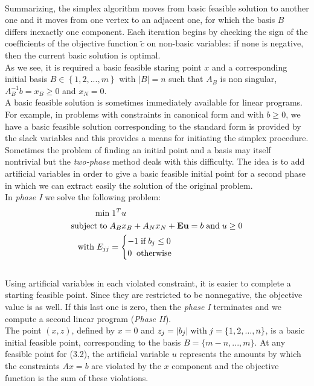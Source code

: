 \documentclass[a4paper,10 pt,titlepage,twoside]{book}
\theoremstyle{plain}
\theoremstyle{definition}
\theoremstyle{remark}
\begin{document}
\\
Summarizing, the simplex algorithm moves from basic feasible solution to another one and it moves from one vertex to an adjacent one, for which the basis $B$ differs inexactly one component. Each iteration begins by checking the sign of the coefficients of the objective function $\widetilde{c}$ on non-basic variables: if none is negative, then the current basic solution is optimal. \\
As we see, it is required a basic feasible staring point $x$ and a corresponding initial basis $B \in \left\{ 1,2,..., m \right\}$ with $|B|=n$ such that $A_{B}$ is non singular, $A_{B}^{-1}b=x_{B} \geq 0$ and $x_{N}=0$.\\
A basic feasible solution is sometimes immediately available for linear programs. For example, in problems with constraints in canonical form and with $b \geq 0$, we have a basic feasible solution corresponding to the standard form is provided by the slack variables and this provides a means for initiating the
simplex procedure.\\Sometimes the problem of finding an initial point and a basis may itself nontrivial but the \textit{two-phase} method deals with this difficulty. The idea is to add artificial variables in order to give a basic feasible initial point for a second phase in which we can extract easily the solution of the original problem.\\
In \textit{phase I} we solve the following problem:
\begin{equation}
\begin{split}
\min &\;1^{T}u\\
\text{subject\;to\;}&A_{B}x_{B}+A_{N}x_{N} + \textbf{Eu} = b\;\text{and\;} u\geq 0\\
\text{with\;} E_{jj}& =\begin{cases} -1\;\text{if\;} b_{j} \leq 0\\
0\;\; \text{otherwise}
\end{cases}   
\end{split}
\end{equation} \\
Using artificial variables in each violated constraint, it is easier to complete a starting feasible point. Since they are restricted to be nonnegative, the objective value is as well. If this last one is zero, then the \textit{phase I} terminates and we compute a second linear program (\textit{Phase II}).\\
The point $(x,z)$, defined by $x = 0$ and $z_{j} = |b_{j}| \text{\;with\;}j =\{1,2,...,n\}$, is a basic initial feasible point, corresponding to the basis $B = \{m-n,...,m\}$. At any feasible point for (3.2), the artificial variable $u$ represents the amounts by which the constraints $Ax = b$ are violated by the $x$ component and the objective function is the sum of these violations. \\
\end{document}
